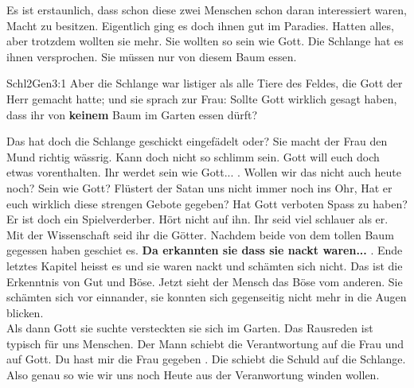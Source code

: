 Es ist erstaunlich, dass schon diese zwei Menschen schon daran interessiert waren, Macht zu besitzen. Eigentlich ging es doch ihnen gut im Paradies. Hatten alles, aber trotzdem wollten sie mehr. Sie wollten so sein wie Gott. Die Schlange hat es ihnen versprochen. Sie müssen nur von diesem Baum essen.
\begin{bibeltext}{Schl2}{Gen}{3:1}
	Aber die Schlange war listiger als alle Tiere des Feldes, die Gott der Herr gemacht hatte; und sie sprach zur Frau: Sollte Gott wirklich gesagt haben, dass ihr von \textbf{keinem} Baum im Garten essen dürft?
\end{bibeltext}
Das hat doch die Schlange geschickt eingefädelt oder? Sie macht der Frau den Mund richtig wässrig. Kann doch nicht so schlimm sein. Gott will euch doch etwas vorenthalten. \flqq Ihr werdet sein wie Gott... \frqq{}. Wollen wir das nicht auch heute noch? Sein wie Gott? Flüstert der Satan uns nicht immer noch ins Ohr, \flqq Hat er euch wirklich diese strengen Gebote gegeben? Hat Gott verboten Spass zu haben? Er ist doch ein Spielverderber. Hört nicht auf ihn. Ihr seid viel schlauer als er. Mit der Wissenschaft seid ihr die Götter.\frqq{} 
Nachdem beide von dem tollen Baum gegessen haben geschiet es. \flqq \textbf{Da erkannten sie dass sie nackt waren...} \frqq{}. Ende letztes Kapitel heisst es \flqq und sie waren nackt und schämten sich nicht\frqq{}. Das ist die Erkenntnis von Gut und Böse. Jetzt sieht der Mensch das Böse vom anderen. Sie schämten sich vor einnander, sie konnten sich gegenseitig nicht mehr in die Augen blicken.\\
Als dann Gott sie suchte versteckten sie sich im Garten. Das Rausreden ist typisch für uns Menschen. Der Mann schiebt die Verantwortung auf die Frau und auf Gott. \flqq Du hast mir die Frau gegeben \frqq{}. Die schiebt die Schuld auf die Schlange. Also genau so wie wir uns noch Heute aus der Veranwortung winden wollen.
